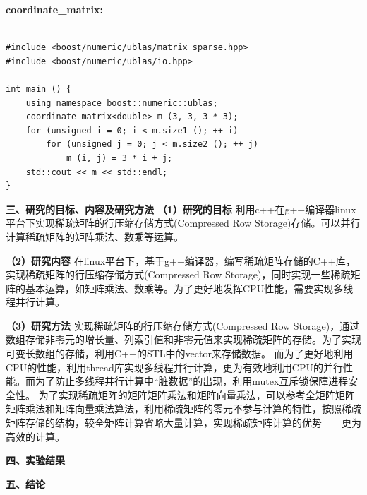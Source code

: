 \documentclass{article}
\begin{document}
\textbf{coordinate\_matrix:}
\begin{lstlisting}

#include <boost/numeric/ublas/matrix_sparse.hpp>
#include <boost/numeric/ublas/io.hpp>

int main () {
    using namespace boost::numeric::ublas;
    coordinate_matrix<double> m (3, 3, 3 * 3);
    for (unsigned i = 0; i < m.size1 (); ++ i)
        for (unsigned j = 0; j < m.size2 (); ++ j)
            m (i, j) = 3 * i + j;
    std::cout << m << std::endl;
}
\end{lstlisting}



\textbf{三、研究的目标、内容及研究方法}
      \qquad
\newline
\textbf{（1）研究的目标}
      \qquad
\newline
利用c++在g++编译器linux平台下实现稀疏矩阵的行压缩存储方式(Compressed Row Storage)存储。可以并行计算稀疏矩阵的矩阵乘法、数乘等运算。
\newline

\textbf{（2）研究内容}
      \qquad
\newline
 在linux平台下，基于g++编译器，编写稀疏矩阵存储的C++库，实现稀疏矩阵的行压缩存储方式(Compressed Row Storage)，同时实现一些稀疏矩阵的基本运算，如矩阵乘法、数乘等。为了更好地发挥CPU性能，需要实现多线程并行计算。

\textbf{（3）研究方法}
      \qquad
\newline
实现稀疏矩阵的行压缩存储方式(Compressed Row Storage)，通过数组存储非零元的增长量、列索引值和非零元值来实现稀疏矩阵的存储。为了实现可变长数组的存储，利用C++的STL中的vector来存储数据。
\newline
而为了更好地利用CPU的性能，利用thread库实现多线程并行计算，更为有效地利用CPU的并行性能。而为了防止多线程并行计算中“脏数据”的出现，利用mutex互斥锁保障进程安全性。
\newline
为了实现稀疏矩阵的矩阵矩阵乘法和矩阵向量乘法，可以参考全矩阵矩阵矩阵乘法和矩阵向量乘法算法，利用稀疏矩阵的零元不参与计算的特性，按照稀疏矩阵存储的结构，较全矩阵计算省略大量计算，实现稀疏矩阵计算的优势——更为高效的计算。
\newline


\textbf{四、实验结果}
      \qquad
\newline









\textbf{五、结论}
      \qquad
\newline
\end{document}

